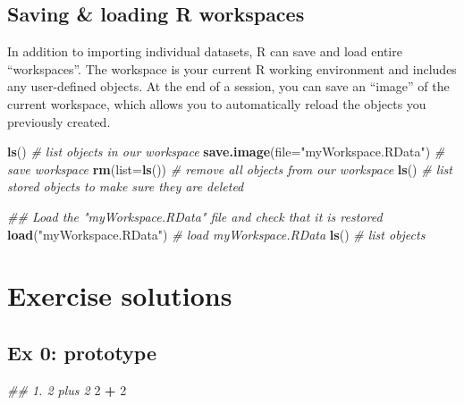\documentclass[]{book}
\newenvironment{Shaded}{\begin{snugshade}}{\end{snugshade}}
\newcommand{\CommentTok}[1]{\textcolor[rgb]{0.56,0.35,0.01}{\textit{#1}}}
\newcommand{\DataTypeTok}[1]{\textcolor[rgb]{0.13,0.29,0.53}{#1}}
\newcommand{\DecValTok}[1]{\textcolor[rgb]{0.00,0.00,0.81}{#1}}
\newcommand{\KeywordTok}[1]{\textcolor[rgb]{0.13,0.29,0.53}{\textbf{#1}}}
\newcommand{\NormalTok}[1]{#1}
\newcommand{\OperatorTok}[1]{\textcolor[rgb]{0.81,0.36,0.00}{\textbf{#1}}}
\newcommand{\StringTok}[1]{\textcolor[rgb]{0.31,0.60,0.02}{#1}}
\begin{document}
\hypertarget{saving-loading-r-workspaces}{%
\subsection{Saving \& loading R workspaces}\label{saving-loading-r-workspaces}}

In addition to importing individual datasets, R can save and load entire
``workspaces''. The workspace is your current R working environment and includes
any user-defined objects. At the end of a session, you can save an ``image''
of the current workspace, which allows you to automatically reload the objects
you previously created.

\begin{Shaded}
\begin{Highlighting}[]
\KeywordTok{ls}\NormalTok{() }\CommentTok{# list objects in our workspace}
\KeywordTok{save.image}\NormalTok{(}\DataTypeTok{file=}\StringTok{"myWorkspace.RData"}\NormalTok{) }\CommentTok{# save workspace }
\KeywordTok{rm}\NormalTok{(}\DataTypeTok{list=}\KeywordTok{ls}\NormalTok{()) }\CommentTok{# remove all objects from our workspace }
\KeywordTok{ls}\NormalTok{() }\CommentTok{# list stored objects to make sure they are deleted}
\end{Highlighting}
\end{Shaded}

\begin{Shaded}
\begin{Highlighting}[]
\CommentTok{## Load the "myWorkspace.RData" file and check that it is restored}
\KeywordTok{load}\NormalTok{(}\StringTok{"myWorkspace.RData"}\NormalTok{) }\CommentTok{# load myWorkspace.RData}
\KeywordTok{ls}\NormalTok{() }\CommentTok{# list objects}
\end{Highlighting}
\end{Shaded}

\hypertarget{exercise-solutions}{%
\section{Exercise solutions}\label{exercise-solutions}}

\hypertarget{ex-0-prototype}{%
\subsection{Ex 0: prototype}\label{ex-0-prototype}}

\begin{Shaded}
\begin{Highlighting}[]
\CommentTok{## 1. 2 plus 2}
\DecValTok{2} \OperatorTok{+}\StringTok{ }\DecValTok{2}
\end{Highlighting}
\end{Shaded}
\end{document}
